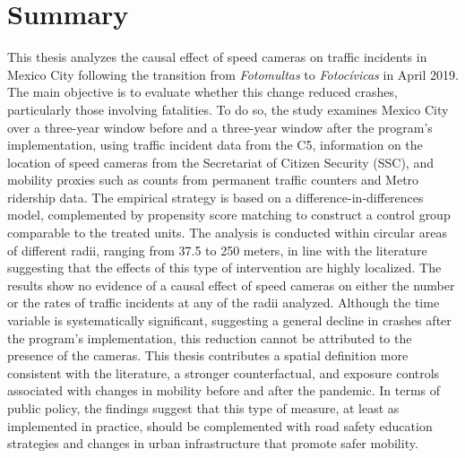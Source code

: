 \documentclass[11pt, oneside]{book}
\begin{document}
\noindent 


\chapter*{Summary}

\noindent This thesis analyzes the causal effect of speed cameras on traffic incidents in Mexico City following the transition from \textit{Fotomultas} to \textit{Fotocívicas} in April 2019. The main objective is to evaluate whether this change reduced crashes, particularly those involving fatalities. To do so, the study examines Mexico City over a three-year window before and a three-year window after the program's implementation, using traffic incident data from the C5, information on the location of speed cameras from the Secretariat of Citizen Security (SSC), and mobility proxies such as counts from permanent traffic counters and Metro ridership data. The empirical strategy is based on a difference-in-differences model, complemented by propensity score matching to construct a control group comparable to the treated units. The analysis is conducted within circular areas of different radii, ranging from 37.5 to 250 meters, in line with the literature suggesting that the effects of this type of intervention are highly localized. The results show no evidence of a causal effect of speed cameras on either the number or the rates of traffic incidents at any of the radii analyzed. Although the time variable is systematically significant, suggesting a general decline in crashes after the program's implementation, this reduction cannot be attributed to the presence of the cameras. This thesis contributes a spatial definition more consistent with the literature, a stronger counterfactual, and exposure controls associated with changes in mobility before and after the pandemic. In terms of public policy, the findings suggest that this type of measure, at least as implemented in practice, should be complemented with road safety education strategies and changes in urban infrastructure that promote safer mobility.

\pagestyle{plain}

\noindent 

\end{document}

